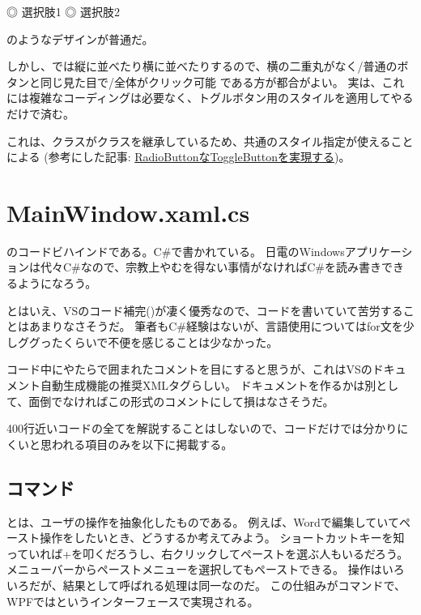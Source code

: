 \documentclass[letterpaper,10pt,dvipdfmx]{sphinxmanual}
\begin{document}
\begin{sphinxVerbatim}[commandchars=\\\{\}]
◎ 選択肢1
◎ 選択肢2
\end{sphinxVerbatim}

のようなデザインが普通だ。

しかし、では縦に並べたり横に並べたりするので、横の二重丸がなく/普通のボタンと同じ見た目で/全体がクリック可能
である方が都合がよい。
実は、これには複雑なコーディングは必要なく、トグルボタン用のスタイルを適用してやるだけで済む。

これは、クラスがクラスを継承しているため、共通のスタイル指定が使えることによる
(参考にした記事:
\href{http://neareal.net/index.php?Programming\%2F.NetFramework\%2FWPF\%2FRadioToggleButton}{RadioButtonなToggleButtonを実現する})。


\section{MainWindow.xaml.cs}
\label{\detokenize{nissyu-idohen/pc-software-code:mainwindow-xaml-cs}}
のコードビハインドである。C\#で書かれている。
日電のWindowsアプリケーションは代々C\#なので、宗教上やむを得ない事情がなければC\#を読み書きできるようになろう。

とはいえ、VSのコード補完()が凄く優秀なので、コードを書いていて苦労することはあまりなさそうだ。
筆者もC\#経験はないが、言語使用についてはfor文を少しググったくらいで不便を感じることは少なかった。

コード中にやたらで囲まれたコメントを目にすると思うが、これはVSのドキュメント自動生成機能の推奨XMLタグらしい。
ドキュメントを作るかは別として、面倒でなければこの形式のコメントにして損はなさそうだ。

400行近いコードの全てを解説することはしないので、コードだけでは分かりにくいと思われる項目のみを以下に掲載する。


\subsection{コマンド}
\label{\detokenize{nissyu-idohen/pc-software-code:id9}}
 とは、ユーザの操作を抽象化したものである。
例えば、Wordで編集していてペースト操作をしたいとき、どうするか考えてみよう。
ショートカットキーを知っていれば+を叩くだろうし、右クリックしてペーストを選ぶ人もいるだろう。
メニューバーからペーストメニューを選択してもペーストできる。
操作はいろいろだが、結果として呼ばれる処理は同一なのだ。
この仕組みがコマンドで、WPFではというインターフェースで実現される。
\end{document}
